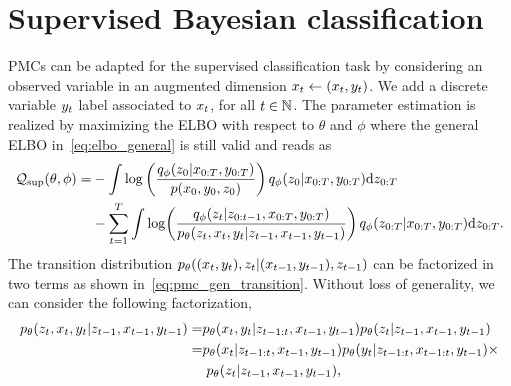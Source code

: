 \chapter{Supervised Bayesian classification}
\label{chap:appendix2}

PMCs can be adapted for the supervised classification task 
by considering an observed variable in an augmented dimension
$x_{t}  \leftarrow (x_{t},y_{t})$. 
We add a discrete variable $y_{t}$ label associated to 
$x_{t}$, for all $t \in \mathbb{N}$.
The parameter estimation is realized by maximizing the ELBO with 
respect to $\theta$ and $\phi$
where the general ELBO in~\eqref{eq:elbo_general} 
is still valid and  reads as
\begin{align*}
    \mathcal{Q}_{\mathrm{sup}}(\theta,\phi)= & - \int \log \left(\frac{q_\phi(z_0|x_{0:T}, y_{0:T})}
    {p(x_0, y_0, z_0)}\right) q_\phi(z_0|x_{0:T}, y_{0:T}) {\rm d} z_{0:T}
    \nonumber \\
    &- \sum_{t=1}^T \int  \log\! \left(\frac{q_\phi(z_t|z_{0:
    t-1},x_{0:T}, y_{0:T})}{p_{\theta}(z_t,x_t, y_t|z_{t-1},x_{t-1}, y_{t-1})}\right) 
    q_\phi(z_{0:T}|x_{0:T}, y_{0:T}){\rm d}z_{0:T} \text{.}
\end{align*}
The transition distribution 
$p_{\theta}((x_t, y_t), z_t| (x_{t-1}, y_{t-1}), z_{t-1})$
can be factorized in two terms as shown in~\eqref{eq:pmc_gen_transition}.
Without loss of generality, we can consider the following factorization,
\begin{align}
    p_{\theta}(z_t,x_t, y_t|z_{t-1},x_{t-1}, y_{t-1}) = &    
    p_{\theta}(x_{t},y_{t} | z_{t-1:t}, x_{t-1},y_{t-1}) 
    p_{\theta}(z_t|z_{t-1}, x_{t-1},y_{t-1}) \nonumber \\
    = &  p_{\theta}(x_{t}|z_{t-1:t}, x_{t-1},y_{t-1})
    p_{\theta}(y_{t}|z_{t-1:t}, x_{t-1:t},y_{t-1})\times \nonumber \\
    \label{eq:pmc-superv}
    & \;  p_{\theta}(z_t|z_{t-1}, x_{t-1},y_{t-1}) \text{,}
\end{align}
